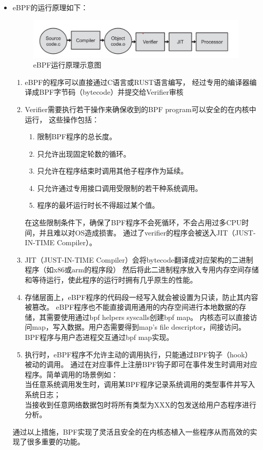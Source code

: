 \documentclass[AutoFakeBold,a4paper]{ctexart}
\begin{document}
\begin{itemize}
    \item eBPF的运行原理如下\cite{vieira2020fast}：
    \begin{figure}[H]
        \centering
        \includegraphics[width=0.9\columnwidth]{../LvHongtao/pic_1.jpg}
        \caption{eBPF运行原理示意图}
    \end{figure}
    \begin{enumerate}
        \item eBPF的程序可以直接通过C语言或RUST语言编写，
        经过专用的编译器编译成BPF字节码（bytecode）并提交给Verifier审核
        \item Verifier需要执行若干操作来确保收到的BPF program可以安全的在内核中运行，
        这些操作包括：
        \begin{enumerate}
            \item 限制BPF程序的总长度。
            \item 只允许出现固定轮数的循环。
            \item 只允许在程序结束时调用其他子程序作为延续。
            \item 只允许通过专用接口调用受限制的若干种系统调用。
            \item 程序的最坏运行时长不得超过某个值。
        \end{enumerate}
        在这些限制条件下，确保了BPF程序不会死循环，不会占用过多CPU时间，并且难以对OS造成损害。
        通过了verifier的程序会被送入JIT（JUST-IN-TIME Compiler）。
        \item JIT（JUST-IN-TIME Compiler）会将bytecode翻译成对应架构的二进制程序（如x86或arm的程序段）
        然后将此二进制程序放入专用内存空间存储和等待运行，使此程序的运行时拥有几乎原生的性能。
        \item 存储层面上，eBPF程序的代码段一经写入就会被设置为只读，防止其内容被篡改。
        eBPF程序也不能直接调用通用的内存空间进行本地数据的存储，其需要使用通过bpf helpers syscalls创建bpf map。
        内核态可以直接访问map，写入数据。用户态需要得到map's file descriptor，间接访问。
        BPF程序与用户态进程交互通过bpf map实现。
        
        \item 执行时，eBPF程序不允许主动的调用执行，只能通过BPF钩子（hook）被动的调用。
        通过在对应事件上注册BPF钩子即可在事件发生时调用对应程序。简单调用的场景例如：\\
        当任意系统调用发生时，调用某BPF程序记录系统调用的类型事件并写入系统日志；\\
        当接收到任意网络数据包时将所有类型为XXX的包发送给用户态程序进行分析。
    \end{enumerate}
    通过以上措施，BPF实现了灵活且安全的在内核态植入一些程序从而高效的实现了很多重要的功能。


\end{itemize}
\end{document}
